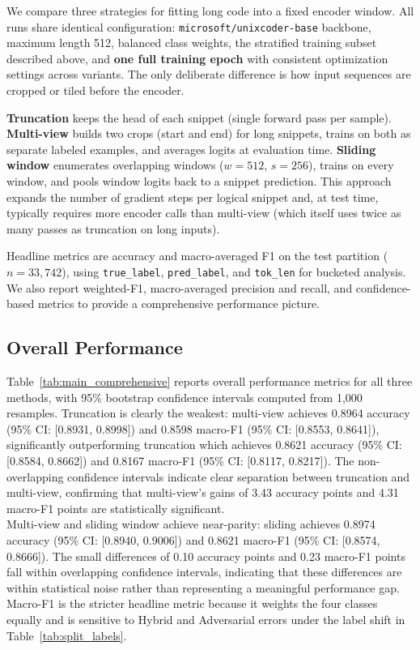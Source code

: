 \documentclass[conference]{IEEEtran}
\begin{document}
We compare three strategies for fitting long code into a fixed encoder window. All runs share identical configuration: \texttt{microsoft/unixcoder-base} backbone, maximum length 512, balanced class weights, the stratified training subset described above, and \textbf{one full training epoch} with consistent optimization settings across variants. The only deliberate difference is how input sequences are cropped or tiled before the encoder.

\textbf{Truncation} keeps the head of each snippet (single forward pass per sample). \textbf{Multi-view} builds two crops (start and end) for long snippets, trains on both as separate labeled examples, and averages logits at evaluation time. \textbf{Sliding window} enumerates overlapping windows ($w{=}512$, $s{=}256$), trains on every window, and pools window logits back to a snippet prediction. This approach expands the number of gradient steps per logical snippet and, at test time, typically requires more encoder calls than multi-view (which itself uses twice as many passes as truncation on long inputs).

Headline metrics are accuracy and macro-averaged F1 on the test partition ($n{=}33{,}742$), using \texttt{true\_label}, \texttt{pred\_label}, and \texttt{tok\_len} for bucketed analysis. We also report weighted-F1, macro-averaged precision and recall, and confidence-based metrics to provide a comprehensive performance picture.

\subsection{Overall Performance}

Table~\ref{tab:main_comprehensive} reports overall performance metrics for all three methods, with 95\% bootstrap confidence intervals computed from 1,000 resamples. Truncation is clearly the weakest: multi-view achieves 0.8964 accuracy (95\% CI: [0.8931, 0.8998]) and 0.8598 macro-F1 (95\% CI: [0.8553, 0.8641]), significantly outperforming truncation which achieves 0.8621 accuracy (95\% CI: [0.8584, 0.8662]) and 0.8167 macro-F1 (95\% CI: [0.8117, 0.8217]). The non-overlapping confidence intervals indicate clear separation between truncation and multi-view, confirming that multi-view's gains of 3.43 accuracy points and 4.31 macro-F1 points are statistically significant.\\

Multi-view and sliding window achieve near-parity: sliding achieves 0.8974 accuracy (95\% CI: [0.8940, 0.9006]) and 0.8621 macro-F1 (95\% CI: [0.8574, 0.8666]). The small differences of 0.10 accuracy points and 0.23 macro-F1 points fall within overlapping confidence intervals, indicating that these differences are within statistical noise rather than representing a meaningful performance gap. Macro-F1 is the stricter headline metric because it weights the four classes equally and is sensitive to Hybrid and Adversarial errors under the label shift in Table~\ref{tab:split_labels}.
\end{document}
